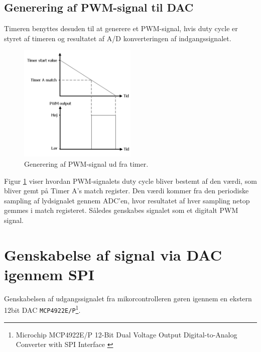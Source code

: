 \subsection{Generering af PWM-signal til DAC}
Timeren benyttes desuden til at generere et PWM-signal, hvis duty cycle er styret af timeren og resultatet af A/D konverteringen af indgangssignalet. 
\begin{figure}
	\centering
	\includegraphics[width=0.5\textwidth]{billeder/timer3PWM.png}
	\caption{\label{fig:PWMfromtimer}Generering af PWM-signal ud fra timer. }
\end{figure}
Figur \ref{fig:PWMfromtimer} viser hvordan PWM-signalets duty cycle bliver bestemt af den værdi, som bliver gemt på Timer A's match register. 
Den værdi kommer fra den periodiske sampling af lydsignalet gennem ADC'en, hvor resultatet af hver sampling netop gemmes i match registeret. 
Således genskabes signalet som et digitalt PWM signal. 

\section{Genskabelse af signal via DAC igennem SPI}
Genskabelsen af udgangssignalet fra mikorcontrolleren gøren igennem en ekstern 12bit DAC \texttt{MCP4922E/P}\footnote{Microchip MCP4922E/P 12-Bit Dual Voltage Output Digital-to-Analog Converter with SPI Interface \cite{mcp4922} }.




